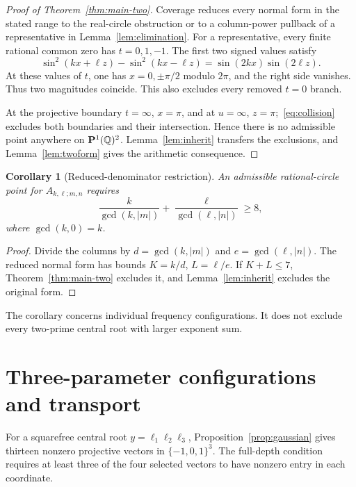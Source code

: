 \documentclass[11pt,letterpaper]{article}
\newtheorem{corollary}[theorem]{Corollary}
\theoremstyle{definition}\newtheorem{definition}[theorem]{Definition}
\theoremstyle{remark}\newtheorem{remark}[theorem]{Remark}
\newcommand{\Q}{\mathbb Q}\newcommand{\Z}{\mathbb Z}\newcommand{\R}{\mathbb R}
\begin{document}
\begin{proof}[Proof of Theorem~\ref{thm:main-two}]
Coverage reduces every normal form in the stated range to the real-circle obstruction or to a column-power pullback of a representative in Lemma~\ref{lem:elimination}. For a representative, every finite rational common zero has $t=0,1,-1$. The first two signed values satisfy
\begin{equation}\label{eq:collision}
 \sin^2(kx+\ell z)-\sin^2(kx-\ell z)
 =\sin(2kx)\sin(2\ell z).
\end{equation}
At these values of $t$, one has $x=0,\pm\pi/2$ modulo $2\pi$, and the right side vanishes. Thus two magnitudes coincide. This also excludes every removed $t=0$ branch.

At the projective boundary $t=\infty$, $x=\pi$, and at $u=\infty$, $z=\pi$;~\eqref{eq:collision} excludes both boundaries and their intersection. Hence there is no admissible point anywhere on $\PP(\Q)^2$. Lemma~\ref{lem:inherit} transfers the exclusions, and Lemma~\ref{lem:twoform} gives the arithmetic consequence.
\end{proof}

\begin{corollary}[Reduced-denominator restriction]\label{cor:denominator}
An admissible rational-circle point for $A_{k,\ell;m,n}$ requires
\[
 \frac{k}{\gcd(k,|m|)}+\frac{\ell}{\gcd(\ell,|n|)}\ge8,
\]
where $\gcd(k,0)=k$.
\end{corollary}
\begin{proof}
Divide the columns by $d=\gcd(k,|m|)$ and $e=\gcd(\ell,|n|)$. The reduced normal form has bounds $K=k/d$, $L=\ell/e$. If $K+L\le7$, Theorem~\ref{thm:main-two} excludes it, and Lemma~\ref{lem:inherit} excludes the original form.
\end{proof}
The corollary concerns individual frequency configurations. It does not exclude every two-prime central root with larger exponent sum.

\section{Three-parameter configurations and transport}\label{sec:three}
For a squarefree central root $y=\ell_1\ell_2\ell_3$, Proposition~\ref{prop:gaussian} gives thirteen nonzero projective vectors in $\{-1,0,1\}^3$. The full-depth condition requires at least three of the four selected vectors to have nonzero entry in each coordinate.
\end{document}
